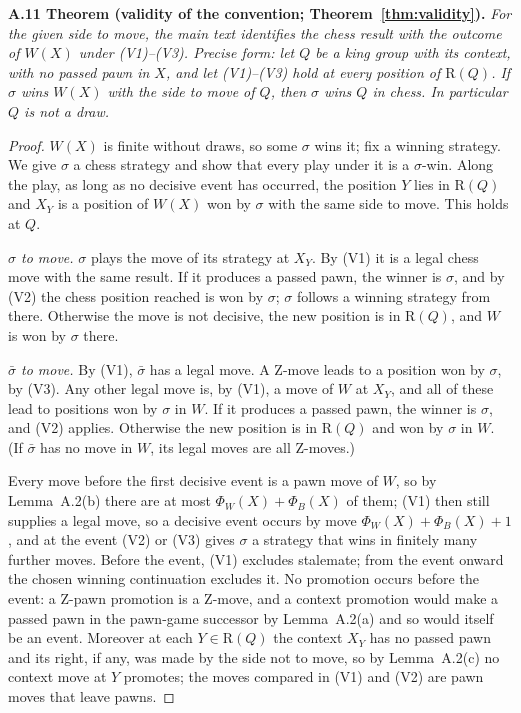 \textbf{A.11 Theorem (validity of the convention; Theorem~\ref{thm:validity}).} \emph{For the given side to move, the main text identifies the chess result with the outcome of $W(X)$ under (V1)--(V3). Precise form: let $Q$ be a
king group with its context, with no passed pawn in $X$, and let (V1)--(V3) hold at every position of $\mathrm{R}(Q)$. If
$\sigma$ wins $W(X)$ with the side to move of $Q$, then $\sigma$ wins $Q$ in chess. In particular $Q$ is not a draw.}

\begin{proof}
$W(X)$ is finite without draws, so some $\sigma$ wins it; fix a winning strategy. We give $\sigma$ a chess strategy and
show that every play under it is a $\sigma$-win. Along the play, as long as no decisive event has occurred, the position
$Y$ lies in $\mathrm{R}(Q)$ and $X_Y$ is a position of $W(X)$ won by $\sigma$ with the same side to move. This holds at $Q$.

\emph{$\sigma$ to move.} $\sigma$ plays the move of its strategy at $X_Y$. By (V1) it is a legal chess move with the same
result. If it produces a passed pawn, the winner is $\sigma$, and by (V2) the chess position reached is won by $\sigma$; $\sigma$ follows
a winning strategy from there. Otherwise the move is not decisive, the new position is in $\mathrm{R}(Q)$, and $W$ is won by
$\sigma$ there.

\emph{$\bar\sigma$ to move.} By (V1), $\bar\sigma$ has a legal move. A Z-move leads to a position won by $\sigma$, by (V3).
Any other legal move is, by (V1), a move of $W$ at $X_Y$, and all of these lead to positions won by $\sigma$ in $W$. If it
produces a passed pawn, the winner is $\sigma$, and (V2) applies. Otherwise the new position is in $\mathrm{R}(Q)$ and won by $\sigma$ in
$W$. (If $\bar\sigma$ has no move in $W$, its legal moves are all Z-moves.)

Every move before the first decisive event is a pawn move of $W$, so by Lemma~A.2(b) there are at most
$\Phi_W(X)+\Phi_B(X)$ of them; (V1) then still supplies a legal move, so a decisive event occurs by move $\Phi_W(X)+\Phi_B(X)+1$, and at the event (V2) or (V3) gives $\sigma$ a strategy that wins in finitely many further moves. Before the event, (V1) excludes stalemate; from the event onward the chosen winning continuation excludes it. No promotion occurs before the event: a Z-pawn promotion is a Z-move, and a context
promotion would make a passed pawn in the pawn-game successor by Lemma~A.2(a) and so would itself be an event. Moreover at each $Y\in\mathrm{R}(Q)$ the context
$X_Y$ has no passed pawn and its right, if any, was made by the side not to move, so by Lemma~A.2(c) no context move at $Y$
promotes; the moves compared in (V1) and (V2) are pawn moves that leave pawns.
\end{proof}

